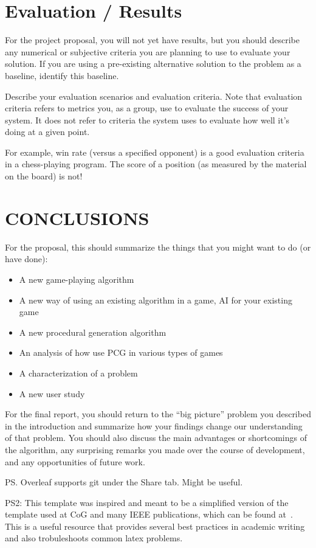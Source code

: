 \documentclass[conference]{IEEEtran}
\begin{document}
\section{Evaluation / Results}

For the project proposal, you will not yet have results, but you should describe any numerical or subjective criteria you are planning to use to evaluate your solution. If you are using a pre-existing alternative solution to the problem as a baseline, identify this baseline.

Describe your evaluation scenarios  and  evaluation criteria. Note that evaluation criteria refers to metrics you, as a group, use to evaluate the success of your system. It does not refer to criteria the system uses to evaluate how well it’s doing at a given point.

For example, win rate (versus a specified opponent) is a good evaluation criteria in a chess-playing program. The score of a position (as measured by the material on the board) is not!


\section{CONCLUSIONS}

For the proposal, this should summarize the things that you might want to do (or have done):
\begin{itemize}
\item A new game-playing algorithm
\item A new way of using an existing algorithm in a game, AI for your existing game
\item A new procedural generation algorithm
\item An analysis of how use PCG in various types of games
\item A characterization of a problem
\item A new user study
\end{itemize}

For the final report, you should return to the ``big picture'' problem you described in the introduction and summarize how your findings change our understanding of that problem. You should also discuss the main advantages or shortcomings of the algorithm, any surprising remarks you made over the course of development, and any opportunities of future work.

PS. Overleaf supports git under the Share tab. Might be useful.

PS2: This template was inspired and meant to be a simplified version of the template used at CoG and many IEEE publications, which can be found at~\cite{IEEEtemplate}. This is a useful resource that provides several best practices in academic writing and also trobuleshoots common latex problems.
\end{document}
